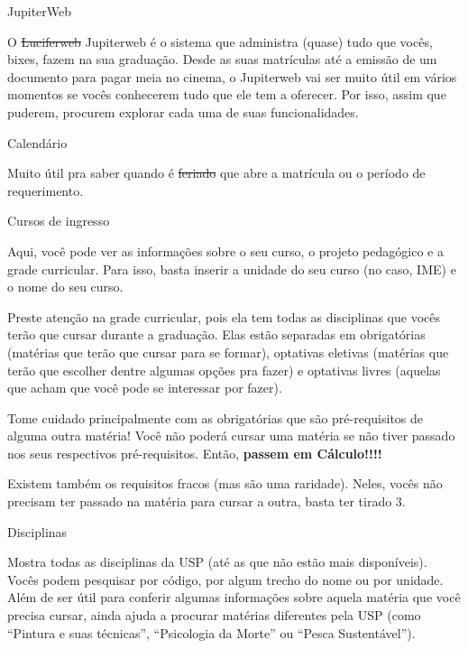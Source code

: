 \begin{secao}{JupiterWeb}

O \sout{Luciferweb} Jupiterweb é o sistema que administra (quase) tudo que
vocês, bixes, fazem na sua graduação. Desde as suas matrículas até a emissão de
um documento para pagar meia no cinema, o Jupiterweb vai ser muito útil em
vários momentos se vocês conhecerem tudo que ele tem a oferecer. Por isso,
assim que puderem, procurem explorar cada uma de suas funcionalidades.

\begin{subsecao}{Calendário}

Muito útil pra saber quando é \sout{feriado} que abre a matrícula ou o período
de requerimento.

\end{subsecao}

\begin{subsecao}{Cursos de ingresso}

Aqui, você pode ver as informações sobre o seu curso, o projeto pedagógico e
a grade curricular. Para isso, basta inserir a unidade do seu curso (no caso,
IME) e o nome do seu curso.

Preste atenção na grade curricular, pois ela tem todas as disciplinas que
vocês terão que cursar durante a graduação. Elas estão separadas em obrigatórias
(matérias que terão que cursar para se formar), optativas eletivas (matérias
que terão que escolher dentre algumas opções pra fazer) e optativas livres
(aquelas que acham que você pode se interessar por fazer).

Tome cuidado principalmente com as obrigatórias que são pré-requisitos de
alguma outra matéria! Você não poderá cursar uma matéria se não tiver passado
nos seus respectivos pré-requisitos. Então, \textbf{passem em Cálculo!!!!}

Existem também os requisitos fracos (mas são uma raridade). Neles, vocês não 
precisam ter passado na matéria para cursar a outra, basta ter tirado 3.

\end{subsecao}

\begin{subsecao}{Disciplinas}

Mostra todas as disciplinas da USP (até as que não estão mais disponíveis).
Vocês podem pesquisar por código, por algum trecho do nome ou por unidade. 
Além de ser útil para conferir algumas informações sobre aquela matéria que 
você precisa cursar, ainda ajuda a procurar matérias diferentes pela USP 
(como “Pintura e suas técnicas”, “Psicologia da Morte” ou “Pesca Sustentável”).


\end{subsecao}
\end{secao}
